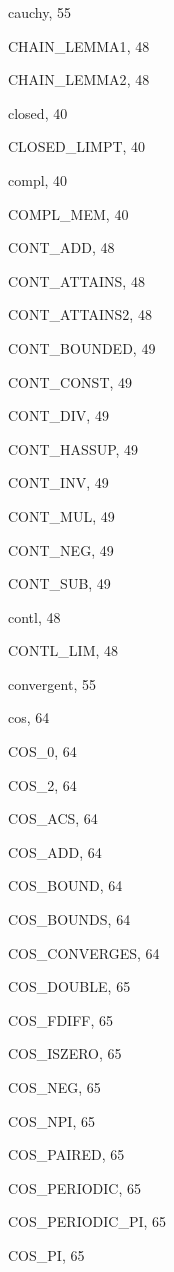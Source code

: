 \begin{theindex}
  \item {\ptt cauchy}, 55
  \item {\ptt CHAIN\_LEMMA1}, 48
  \item {\ptt CHAIN\_LEMMA2}, 48
  \item {\ptt closed}, 40
  \item {\ptt CLOSED\_LIMPT}, 40
  \item {\ptt compl}, 40
  \item {\ptt COMPL\_MEM}, 40
  \item {\ptt CONT\_ADD}, 48
  \item {\ptt CONT\_ATTAINS}, 48
  \item {\ptt CONT\_ATTAINS2}, 48
  \item {\ptt CONT\_BOUNDED}, 49
  \item {\ptt CONT\_CONST}, 49
  \item {\ptt CONT\_DIV}, 49
  \item {\ptt CONT\_HASSUP}, 49
  \item {\ptt CONT\_INV}, 49
  \item {\ptt CONT\_MUL}, 49
  \item {\ptt CONT\_NEG}, 49
  \item {\ptt CONT\_SUB}, 49
  \item {\ptt contl}, 48
  \item {\ptt CONTL\_LIM}, 48
  \item {\ptt convergent}, 55
  \item {\ptt cos}, 64
  \item {\ptt COS\_0}, 64
  \item {\ptt COS\_2}, 64
  \item {\ptt COS\_ACS}, 64
  \item {\ptt COS\_ADD}, 64
  \item {\ptt COS\_BOUND}, 64
  \item {\ptt COS\_BOUNDS}, 64
  \item {\ptt COS\_CONVERGES}, 64
  \item {\ptt COS\_DOUBLE}, 65
  \item {\ptt COS\_FDIFF}, 65
  \item {\ptt COS\_ISZERO}, 65
  \item {\ptt COS\_NEG}, 65
  \item {\ptt COS\_NPI}, 65
  \item {\ptt COS\_PAIRED}, 65
  \item {\ptt COS\_PERIODIC}, 65
  \item {\ptt COS\_PERIODIC\_PI}, 65
  \item {\ptt COS\_PI}, 65

\end{theindex}
